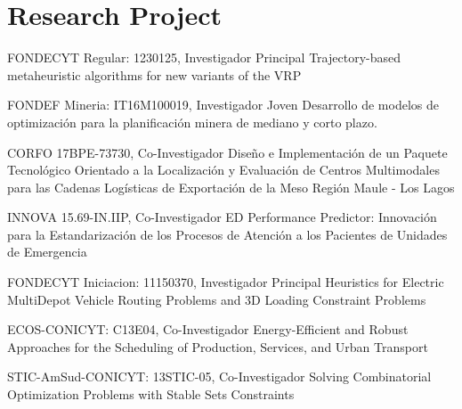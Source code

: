 \section{Research Project}

{FONDECYT Regular: 1230125, Investigador Principal}
{Trajectory-based metaheuristic algorithms for new variants of the VRP}

{FONDEF Mineria: IT16M100019, Investigador Joven}
{Desarrollo de modelos de optimizaci\'on para la planificaci\'on minera de mediano y corto plazo.}

{CORFO 17BPE-73730, Co-Investigador}
{Dise\~no e Implementaci\'on de un Paquete Tecnol\'ogico Orientado a la Localizaci\'on y Evaluaci\'on de Centros Multimodales para las Cadenas Log\'isticas de Exportaci\'on de la Meso Regi\'on Maule - Los Lagos}

{INNOVA 15.69-IN.IIP, Co-Investigador}
{ED Performance Predictor: Innovaci\'on para la Estandarizaci\'on de los Procesos de Atenci\'on a los Pacientes de Unidades de Emergencia}

{FONDECYT Iniciacion: 11150370, Investigador Principal}
{Heuristics for Electric MultiDepot Vehicle Routing Problems and 3D Loading Constraint Problems}

{ECOS-CONICYT: C13E04, Co-Investigador}
{Energy-Efficient and Robust Approaches for the Scheduling of Production, Services, and Urban Transport}

{STIC-AmSud-CONICYT: 13STIC-05, Co-Investigador}
{Solving Combinatorial Optimization Problems with Stable Sets Constraints}

